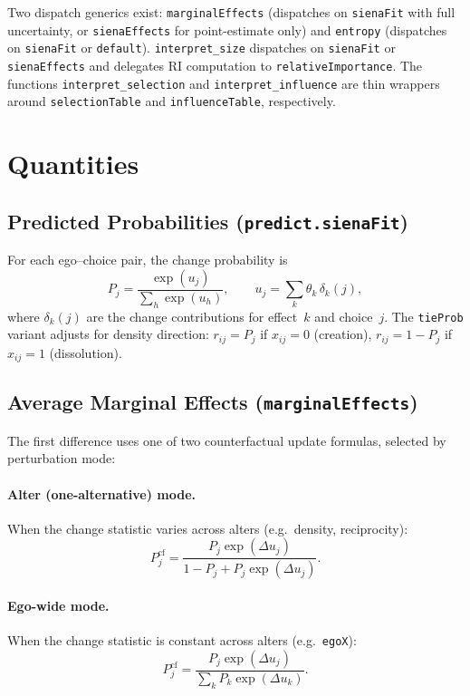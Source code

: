 \documentclass[11pt,a4paper]{article}
\begin{document}
Two dispatch generics exist: \texttt{marginalEffects} (dispatches on
\texttt{sienaFit} with full uncertainty, or \texttt{sienaEffects} for
point-estimate only) and \texttt{entropy} (dispatches on \texttt{sienaFit}
or \texttt{default}).  \texttt{interpret\_size} dispatches on
\texttt{sienaFit} or \texttt{sienaEffects} and delegates RI computation to
\texttt{relativeImportance}.  The functions \texttt{interpret\_selection} and
\texttt{interpret\_influence} are thin wrappers around \texttt{selectionTable}
and \texttt{influenceTable}, respectively.


\section{Quantities}

\subsection{Predicted Probabilities (\texttt{predict.sienaFit})}
For each ego--choice pair, the change probability is
\[
  P_j = \frac{\exp(u_j)}{\sum_h \exp(u_h)},
  \qquad u_j = \sum_k \theta_k \, \delta_k(j),
\]
where $\delta_k(j)$ are the change contributions for effect~$k$ and choice~$j$.
The \texttt{tieProb} variant adjusts for density direction:
$r_{ij} = P_j$ if $x_{ij}=0$ (creation), $r_{ij} = 1 - P_j$ if $x_{ij}=1$
(dissolution).

\subsection{Average Marginal Effects (\texttt{marginalEffects})}

The first difference uses one of two counterfactual update formulas,
selected by perturbation mode:

\paragraph{Alter (one-alternative) mode.}
When the change statistic varies across alters
(e.g.\ density, reciprocity):
\[
  P_j^{\mathrm{cf}}
    = \frac{P_j \exp(\Delta u_j)}{1 - P_j + P_j \exp(\Delta u_j)}.
\]

\paragraph{Ego-wide mode.}
When the change statistic is constant across alters
(e.g.\ \texttt{egoX}):
\[
  P_j^{\mathrm{cf}}
    = \frac{P_j \exp(\Delta u_j)}{\sum_k P_k \exp(\Delta u_k)}.
\]
\end{document}
